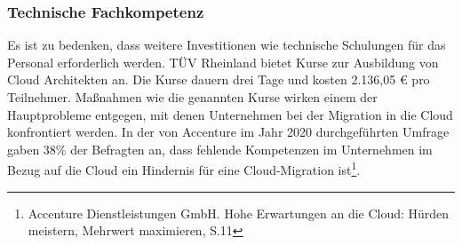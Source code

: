 \subsubsection{Technische Fachkompetenz}
Es ist zu bedenken, dass weitere Investitionen wie technische Schulungen für das Personal erforderlich werden. TÜV Rheinland bietet Kurse zur Ausbildung von Cloud Architekten an. Die Kurse dauern drei Tage und kosten 2.136,05 € pro Teilnehmer. Maßnahmen wie die genannten Kurse wirken einem der Hauptprobleme entgegen, mit denen Unternehmen bei der Migration in die Cloud konfrontiert werden. In der von Accenture im Jahr 2020 durchgeführten Umfrage gaben 38\% der Befragten an, dass fehlende Kompetenzen im Unternehmen im Bezug auf die Cloud ein Hindernis für eine Cloud-Migration ist\footnote{Accenture Dienstleistungen GmbH. Hohe Erwartungen an die Cloud: Hürden
meistern, Mehrwert maximieren, S.11\cite{ACC1}}.

